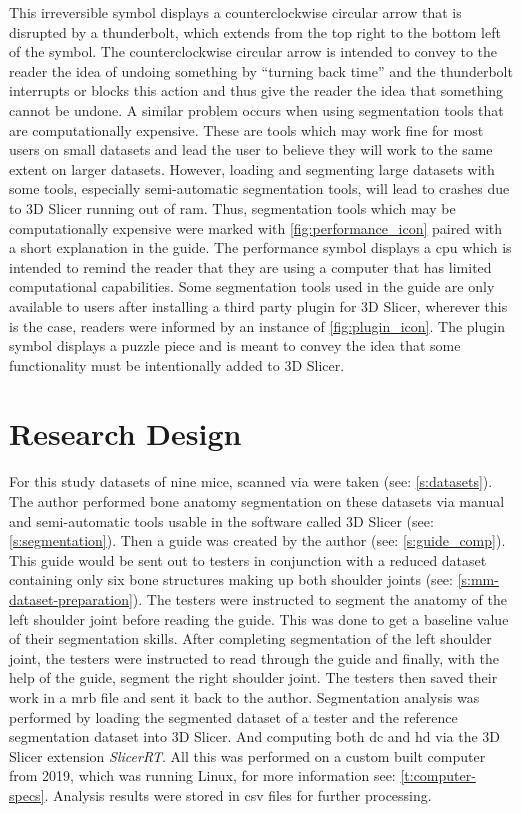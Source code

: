 This irreversible symbol displays a counterclockwise circular arrow that is disrupted by a thunderbolt, which extends from the top right to the bottom left of the symbol.
The counterclockwise circular arrow is intended to convey to the reader the idea of undoing something by ``turning back time'' and the thunderbolt interrupts or blocks this action and thus give the reader the idea that something cannot be undone.
A similar problem occurs when using segmentation tools that are computationally expensive.
These are tools which may work fine for most users on small datasets and lead the user to believe they will work to the same extent on larger datasets.
However, loading and segmenting large datasets with some tools, especially semi-automatic segmentation tools, will lead to crashes due to 3D Slicer running out of \acrfull{ram}.
Thus, segmentation tools which may be computationally expensive were marked with \cref{fig:performance_icon} paired with a short explanation in the guide.
The performance symbol displays a \acrfull{cpu} which is intended to remind the reader that they are using a computer that has limited computational capabilities.
Some segmentation tools used in the guide are only available to users after installing a third party plugin for 3D Slicer, wherever this is the case, readers were informed by an instance of \cref{fig:plugin_icon}.
The plugin symbol displays a puzzle piece and is meant to convey the idea that some functionality must be intentionally added to 3D Slicer.

\section{Research Design}\label{s:researchDesign}
For this study datasets of nine mice, scanned via \mct\space were taken (see: \cref{s:datasets}).
The author performed bone anatomy segmentation on these datasets via manual and semi-automatic tools usable in the software called 3D Slicer (see: \cref{s:segmentation}).
Then a guide was created by the author (see: \cref{s:guide_comp}).
This guide would be sent out to testers in conjunction with a reduced dataset containing only six bone structures making up both shoulder joints (see: \cref{s:mm-dataset-preparation}).
The testers were instructed to segment the anatomy of the left shoulder joint before reading the guide.
This was done to get a baseline value of their segmentation skills.
After completing segmentation of the left shoulder joint, the testers were instructed to read through the guide and finally,
with the help of the guide, segment the right shoulder joint.
The testers then saved their work in a \acrfull{mrb} file and sent it back to the author.
Segmentation analysis was performed by loading the segmented dataset of a tester and the reference segmentation dataset into 3D Slicer.
And computing both \acrlong{dc} and \acrlong{hd} via the 3D Slicer extension \textit{SlicerRT}.
All this was performed on a custom built computer from 2019,
which was running Linux, for more information see: \cref{t:computer-specs}.
Analysis results were stored in \acrfull{csv} files for further processing.


